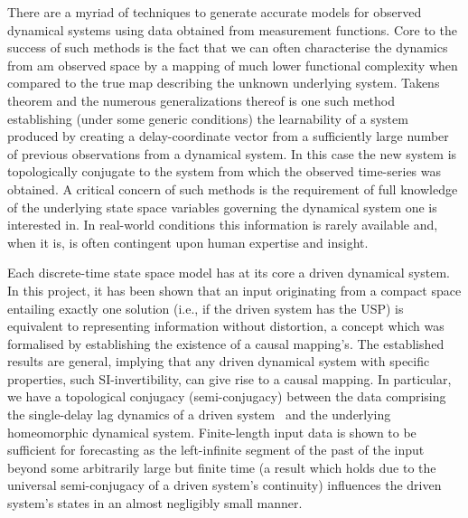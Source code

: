 
There are a myriad of techniques to generate accurate models for observed dynamical systems using data obtained from measurement functions.
Core to the success of such methods is the fact that we can often characterise the dynamics from am observed space by a mapping of much lower functional complexity when compared to the true map describing the unknown underlying system. 
Takens theorem and the numerous generalizations thereof is one such method establishing (under some generic conditions) the learnability of a system produced by creating a delay-coordinate vector from a sufficiently large number of previous observations from a dynamical system. 
In this case the new system is topologically conjugate to the system from which the observed time-series was obtained.
A critical concern of such methods is the requirement of full knowledge of the underlying state space variables governing the dynamical system one is interested in. In real-world conditions this information is rarely available and, when it is, is often contingent upon human expertise and insight. 

Each discrete-time state space model has at its core a driven dynamical system. 
In this project, it has been shown that an input originating from a compact space entailing exactly one solution (i.e., if the driven system has the USP) is equivalent to representing information without distortion, a concept which was formalised by establishing the existence of a causal mapping’s. 
The established results are general, implying that any driven dynamical system with specific properties, such SI-invertibility, can give rise to a causal mapping. 
In particular, we have a topological conjugacy (semi-conjugacy) between the data comprising the single-delay lag dynamics of a driven system~\cite{manjunath2013echo} and the underlying homeomorphic dynamical system. 
Finite-length input data is shown to be sufficient for forecasting as the left-infinite segment of the past of the input beyond some arbitrarily large but finite time (a result which holds due to the universal semi-conjugacy of a driven system’s continuity) influences the driven system's states in an almost negligibly small manner.


